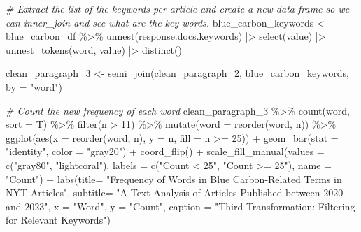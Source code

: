 \documentclass[
]{article}
\newenvironment{Shaded}{\begin{snugshade}}{\end{snugshade}}
\newcommand{\AttributeTok}[1]{\textcolor[rgb]{0.77,0.63,0.00}{#1}}
\newcommand{\CommentTok}[1]{\textcolor[rgb]{0.56,0.35,0.01}{\textit{#1}}}
\newcommand{\DecValTok}[1]{\textcolor[rgb]{0.00,0.00,0.81}{#1}}
\newcommand{\FunctionTok}[1]{\textcolor[rgb]{0.00,0.00,0.00}{#1}}
\newcommand{\NormalTok}[1]{#1}
\newcommand{\OtherTok}[1]{\textcolor[rgb]{0.56,0.35,0.01}{#1}}
\newcommand{\SpecialCharTok}[1]{\textcolor[rgb]{0.00,0.00,0.00}{#1}}
\newcommand{\StringTok}[1]{\textcolor[rgb]{0.31,0.60,0.02}{#1}}
\begin{document}
\begin{Shaded}
\begin{Highlighting}[]
\CommentTok{\# Extract the list of the keywords per article and create a new data frame so we can inner\_join and see what are the key words.}
\NormalTok{blue\_carbon\_keywords }\OtherTok{\textless{}{-}}\NormalTok{ blue\_carbon\_df }\SpecialCharTok{\%\textgreater{}\%}
  \FunctionTok{unnest}\NormalTok{(response.docs.keywords) }\SpecialCharTok{|\textgreater{}} 
  \FunctionTok{select}\NormalTok{(value) }\SpecialCharTok{|\textgreater{}} 
  \FunctionTok{unnest\_tokens}\NormalTok{(word, value) }\SpecialCharTok{|\textgreater{}} 
  \FunctionTok{distinct}\NormalTok{()}
  

\NormalTok{clean\_paragraph\_3 }\OtherTok{\textless{}{-}} \FunctionTok{semi\_join}\NormalTok{(clean\_paragraph\_2, blue\_carbon\_keywords, }\AttributeTok{by =} \StringTok{"word"}\NormalTok{)}

\CommentTok{\# Count the new frequency of each word}
\NormalTok{clean\_paragraph\_3 }\SpecialCharTok{\%\textgreater{}\%}
  \FunctionTok{count}\NormalTok{(word, }\AttributeTok{sort =}\NormalTok{ T) }\SpecialCharTok{\%\textgreater{}\%}
  \FunctionTok{filter}\NormalTok{(n }\SpecialCharTok{\textgreater{}} \DecValTok{11}\NormalTok{) }\SpecialCharTok{\%\textgreater{}\%}
  \FunctionTok{mutate}\NormalTok{(}\AttributeTok{word =} \FunctionTok{reorder}\NormalTok{(word, n)) }\SpecialCharTok{\%\textgreater{}\%}
  \FunctionTok{ggplot}\NormalTok{(}\FunctionTok{aes}\NormalTok{(}\AttributeTok{x =} \FunctionTok{reorder}\NormalTok{(word, n), }\AttributeTok{y =}\NormalTok{ n, }\AttributeTok{fill =}\NormalTok{ n }\SpecialCharTok{\textgreater{}=} \DecValTok{25}\NormalTok{)) }\SpecialCharTok{+}
  \FunctionTok{geom\_bar}\NormalTok{(}\AttributeTok{stat =} \StringTok{"identity"}\NormalTok{, }\AttributeTok{color =} \StringTok{"gray20"}\NormalTok{) }\SpecialCharTok{+}
  \FunctionTok{coord\_flip}\NormalTok{() }\SpecialCharTok{+}
  \FunctionTok{scale\_fill\_manual}\NormalTok{(}\AttributeTok{values =} \FunctionTok{c}\NormalTok{(}\StringTok{"gray80"}\NormalTok{, }\StringTok{"lightcoral"}\NormalTok{), }
                    \AttributeTok{labels =} \FunctionTok{c}\NormalTok{(}\StringTok{"Count \textless{} 25"}\NormalTok{, }\StringTok{"Count \textgreater{}= 25"}\NormalTok{), }
                    \AttributeTok{name =} \StringTok{"Count"}\NormalTok{)  }\SpecialCharTok{+}
  \FunctionTok{labs}\NormalTok{(}\AttributeTok{title=} \StringTok{"Frequency of Words in Blue Carbon{-}Related Terms in NYT Articles"}\NormalTok{,}
       \AttributeTok{subtitle=} \StringTok{"A Text Analysis of Articles Published between 2020 and 2023"}\NormalTok{,}
       \AttributeTok{x =} \StringTok{"Word"}\NormalTok{,}
       \AttributeTok{y =} \StringTok{"Count"}\NormalTok{,}
       \AttributeTok{caption =} \StringTok{"Third Transformation: Filtering for Relevant Keywords"}\NormalTok{)}
\end{Highlighting}
\end{Shaded}
\end{document}
